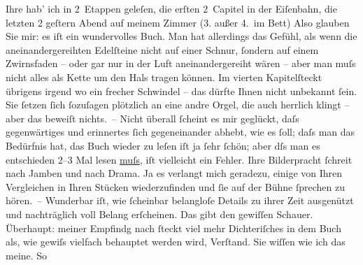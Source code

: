 \pstart
           Ihre hab’ ich in 2 Etappen geleſen,
          die erſten 2 Capitel in der Eiſenbahn, die letzten 2 geſtern Abend auf meinem Zimmer (3.
          außer 4. im Bett) Also glauben Sie mir: es iſt ein wundervolles Buch. Man hat allerdings das Gefühl, als wenn die
          aneinandergereihten Edelſteine nicht auf einer Schnur, {\pb}ſondern auf einem Zwirnsfaden – oder gar nur in der Luft aneinandergereiht wären – aber
          man muſs nicht alles als Kette um den Hals tragen können. Im vierten Kapitelſteckt übrigens irgend wo ein frecher Schwindel – das
          dürfte Ihnen nicht unbekannt{ }ſein. Sie{ }ſetzen{ }ſich{ }ſozuſagen plötzlich an eine andre
          Orgel, die auch herrlich klingt – {\pb}aber das beweiſt
          nichts. – Nicht überall{ }ſcheint es mir geglückt, daſs gegenwärtiges und erinnertes{ }ſich
          gegeneinander abhebt, wie es{ }ſoll; daſs man das Bedürfnis hat, das Buch wieder zu leſen  iſt ja{ }ſehr{ }ſchön; aber dſs man es entschieden 2–3 Mal lesen \uline{muſs}, iſt vielleicht ein Fehler. Ihre Bilderpracht{ }ſchreit
          nach Jamben {\pb}und nach Drama. Ja es verlangt mich geradezu,
          einige von Ihren Vergleichen in Ihren Stücken wiederzufinden und{ }ſie auf der Bühne{ }ſprechen zu hören. – Wunderbar iſt, wie{ }ſcheinbar belangloſe Details zu ihrer Zeit
          ausgenützt und nachträglich voll Belang erſcheinen. Das gibt den gewiſſen Schauer.
          Überhaupt: meiner {\pb}Empfindg nach{ }ſteckt viel mehr
          Dichteriſches in dem Buch als, wie
          gewiſs vielfach behauptet werden wird, Verſtand. Sie wiſſen wie ich das meine. So
